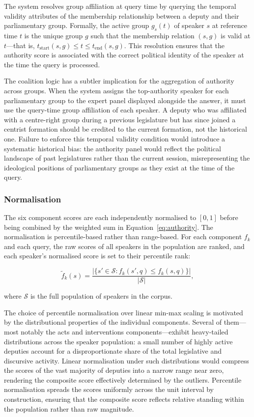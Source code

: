 The system resolves group affiliation at query time by querying the temporal validity attributes
of the membership relationship between a deputy and their parliamentary group. Formally, the
active group $g_s(t)$ of speaker $s$ at reference time $t$ is the unique group $g$ such that
the membership relation $(s, g)$ is valid at $t$---that is, $t_\text{start}(s, g) \leq t \leq
t_\text{end}(s, g)$. This resolution ensures that the authority score is associated with the
correct political identity of the speaker at the time the query is processed.

The coalition logic has a subtler implication for the aggregation of authority across groups.
When the system assigns the top-authority speaker for each parliamentary group to the expert
panel displayed alongside the answer, it must use the query-time group affiliation of each
speaker. A deputy who was affiliated with a centre-right group during a previous legislature
but has since joined a centrist formation should be credited to the current formation, not the
historical one. Failure to enforce this temporal validity condition would introduce a systematic
historical bias: the authority panel would reflect the political landscape of past legislatures
rather than the current session, misrepresenting the ideological positions of parliamentary
groups as they exist at the time of the query.

\subsubsection{Normalisation}

The six component scores are each independently normalised to $[0, 1]$ before being combined
by the weighted sum in Equation~\ref{eq:authority}. The normalisation is percentile-based
rather than range-based. For each component $f_k$ and each query, the raw scores of all speakers
in the population are ranked, and each speaker's normalised score is set to their percentile rank:

\begin{equation}
    \tilde{f}_k(s) = \frac{|\{s' \in \mathcal{S} : f_k(s', q) \leq f_k(s, q)\}|}{|\mathcal{S}|},
\end{equation}

where $\mathcal{S}$ is the full population of speakers in the corpus.

The choice of percentile normalisation over linear min-max scaling is motivated by the
distributional properties of the individual components. Several of them---most notably the
acts and interventions components---exhibit heavy-tailed distributions across the speaker
population: a small number of highly active deputies account for a disproportionate share of
the total legislative and discursive activity. Linear normalisation under such distributions
would compress the scores of the vast majority of deputies into a narrow range near zero,
rendering the composite score effectively determined by the outliers. Percentile normalisation
spreads the scores uniformly across the unit interval by construction, ensuring that the
composite score reflects relative standing within the population rather than raw magnitude.

